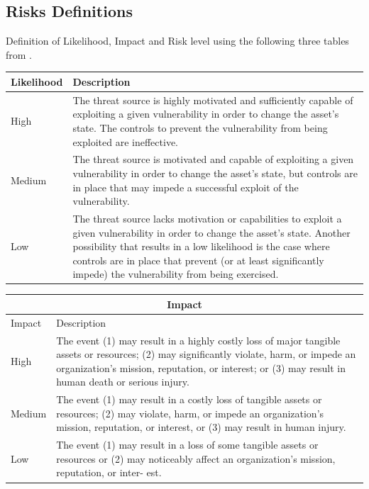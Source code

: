 \documentclass[english]{article}
\begin{document}
\subsection{Risks Definitions}

Definition of Likelihood, Impact and Risk level using the following three
  tables from \cite{ASL_book}.


\begin{center}
\begin{tabular}{|l|p{}|}
\hline
Likelihood & Description \\
\hline
\hline
High   & The threat source is highly motivated and sufficiently capable of exploiting a given vulnerability in order to change the asset's state. The controls to prevent the vulnerability from being exploited are ineffective. \\
\hline
Medium & The threat source is motivated and capable of exploiting a given vulnerability in order to change the asset's state, but controls are in place that may impede a successful exploit of the vulnerability. \\
\hline
Low   & The threat source lacks motivation or capabilities to exploit a given vulnerability in order to change the asset's state. Another possibility that results in a low likelihood is the case where controls are in place that prevent (or at least significantly impede) the vulnerability from being exercised. \\
\hline
\end{tabular}
\hspace{3em}
\begin{tabular}{|l|p{}|}
\hline
\multicolumn{2}{|c|}{\bf Impact} \\
\hline
Impact & Description \\
\hline
\hline
High   & The event (1) may result in a highly costly loss of major tangible assets or resources; (2) may significantly violate, harm, or impede an organization's mission, reputation, or interest; or (3) may result in human death or serious injury. \\
\hline
Medium & The event (1) may result in a costly loss of tangible assets or resources; (2) may violate, harm, or impede an organization's mission, reputation, or interest, or (3) may result in human injury. \\
\hline
Low   & The event (1) may result in a loss of some tangible assets or resources or (2) may noticeably affect an organization's mission, reputation, or inter- est. \\
\hline
\end{tabular}
\end{center}
\end{document}
